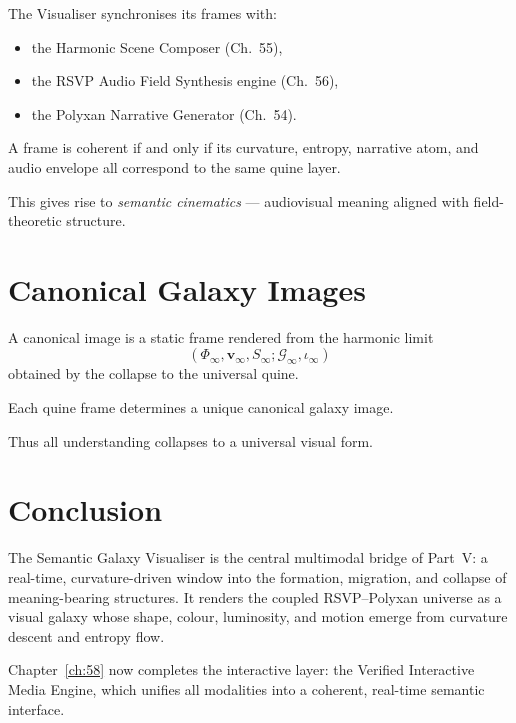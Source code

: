 The Visualiser synchronises its frames with:

\begin{itemize}
  \item the Harmonic Scene Composer (Ch.~55),
  \item the RSVP Audio Field Synthesis engine (Ch.~56),
  \item the Polyxan Narrative Generator (Ch.~54).
\end{itemize}

\begin{theorem}
A frame is coherent if and only if its curvature, entropy, narrative atom, and
audio envelope all correspond to the same quine layer.
\end{theorem}

This gives rise to \emph{semantic cinematics} — audiovisual meaning aligned with
field-theoretic structure.


\section{Canonical Galaxy Images}
\label{sec:57:canonical}

\begin{definition}
A canonical image is a static frame rendered from the harmonic limit
\[
(\Phi_\infty,\mathbf{v}_\infty,S_\infty;\mathcal{G}_\infty,\iota_\infty)
\]
obtained by the collapse to the universal quine.
\end{definition}

\begin{theorem}
Each quine frame determines a unique canonical galaxy image.
\end{theorem}

Thus all understanding collapses to a universal visual form.


\section{Conclusion}
\label{sec:57:conclusion}

The Semantic Galaxy Visualiser is the central multimodal bridge of Part~V:
a real-time, curvature-driven window into the formation, migration, and
collapse of meaning-bearing structures.  
It renders the coupled RSVP--Polyxan universe as a visual galaxy whose shape,
colour, luminosity, and motion emerge from curvature descent and entropy flow.

Chapter~\ref{ch:58} now completes the interactive layer:  
the Verified Interactive Media Engine, which unifies all modalities into a
coherent, real-time semantic interface.

